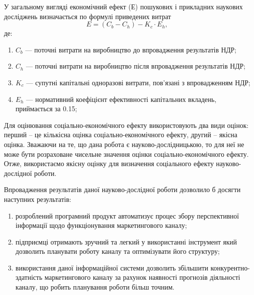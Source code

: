 У загальному вигляді економічний ефект ($Е$) пошукових і прикладних наукових досліджень визначається по формулі приведених витрат
\begin{equation}
E = (C_b - C_h) - K_c   \cdot   E_h, \nonumber
\end{equation}
де:
\begin{enumerate}
\item $C_b$ --- поточні витрати на виробництво до впровадження результатів НДР;
\item $C_h$ --- поточні витрати на виробництво після впровадження результатів НДР;
\item $K_c$ --- супутні капітальні одноразові витрати, пов'язані з впровадженням НДР;
\item $E_h$ --- нормативний коефіцієнт ефективності капітальних вкладень, приймається за 0.15;
\end{enumerate}

Для оцінювання соціально-економічного ефекту використовують два види оцінок: перший – це кількісна оцінка соціально-економічного ефекту, другий – якісна оцінка. Зважаючи на те, що дана робота є науково-дослідницькою, то для неї не може бути розраховане чисельне значення оцінки соціально-економічного ефекту. Отже, використаємо якісну оцінку для визначення соціального ефекту науково-дослідної роботи.

Впровадження результатів даної науково-дослідної роботи дозволило б досягти наступних результатів:
\begin{enumerate}
\item розроблений програмний продукт автоматизує процес збору перспективної інформації щодо функціонування маркетингового каналу;
\item підприємці отримають зручний та легкий у використанні інструмент який дозволить планувати роботу каналу та оптимізувати його структуру;
\item використання даної інформаційної системи дозволить збільшити конкурентно-здатність маркетингового каналу за рахунок наявності прогнозів діяльності каналу, що робить планування роботи більш точним.
\end{enumerate}
